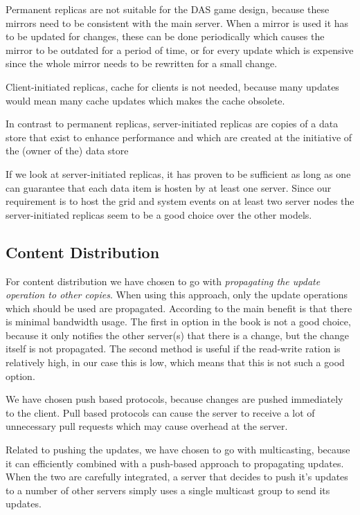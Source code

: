 \documentclass{article}
\begin{document}
Permanent replicas are not suitable for the DAS game design, because these mirrors need to be consistent with the main server. When a mirror is used it has to be updated for changes, these can be done periodically which causes the mirror to be outdated for a period of time, or for every update which is expensive since the whole mirror needs to be rewritten for a small change.  

Client-initiated replicas, cache for clients is not needed, because many updates would mean many cache updates which makes the cache obsolete. 

In contrast to permanent replicas, server-initiated replicas are copies of a data store that exist to enhance performance and which are created at the initiative of the (owner of the) data store %

If we look at server-initiated replicas, it has proven to be sufficient as long as one can guarantee that each data item is hosten by at least one server. Since our requirement is to host the grid and system events on at least two server nodes the server-initiated replicas seem to be a good choice over the other models. 


\subsection{Content Distribution}
For content distribution we have chosen to go with \emph{propagating the update operation to other copies}. When using this approach, only the update operations which should be used are propagated. According to %
the main benefit is that there is minimal bandwidth usage. The first in option in the book is not a good choice, because it only notifies the other server(s) that there is a change, but the change itself is not propagated. The second method is useful if the read-write ration is relatively high, in our case this is low, which means that this is not such a good option.

We have chosen push based protocols, because changes are pushed immediately to the client. Pull based protocols can cause the server to receive a lot of unnecessary pull requests which may cause overhead at the server.

Related to pushing the updates, we have chosen to go with multicasting, because it can efficiently combined with a push-based approach to propagating updates. When the two are carefully integrated, a server that decides to push it's updates to a number of other servers simply uses a single multicast group to send its updates. %
\end{document}
